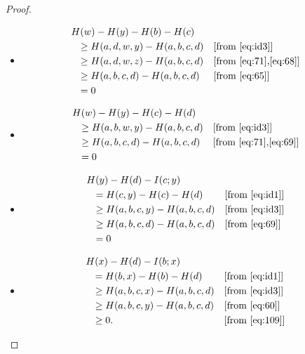 \documentclass[10pt,journal]{IEEEtran}
\begin{document}
\begin{proof}
\begin{itemize}
\item [(iv)]
\begin{align*}
& H(w) - H(y) - H(b) - H(c)\notag\\
&\ \ \ge H(a,d,w,y) - H(a,b,c,d)              & & [\mbox{from \eqref{eq:id3}}] \notag\\
&\ \ \ge H(a,d,w,z) - H(a,b,c,d)              & & [\mbox{from \eqref{eq:71},\eqref{eq:68}}] \notag\\
&\ \ \ge H(a,b,c,d) - H(a,b,c,d)              & & [\mbox{from \eqref{eq:65}}] \notag\\
&\ \ =  0                                     \notag
\end{align*}

\item [(v)]
\begin{align*}
& H(w) - H(y) - H(c) - H(d)\notag\\
&\ \ \ge H(a,b,w,y) - H(a,b,c,d)              & & [\mbox{from \eqref{eq:id3}}] \notag\\
&\ \ \ge H(a,b,c,d) - H(a,b,c,d)              & & [\mbox{from \eqref{eq:71},\eqref{eq:69}}] \notag\\
&\ \ =  0                                     \notag
\end{align*}

\item [(vi)]
\begin{align}
& H(y) - H(d) - I(c;y)\notag\\
&\ \ = H(c,y) - H(c) - H(d)                  & & [\mbox{from \eqref{eq:id1}}] \notag\\
&\ \ \ge H(a,b,c,y) - H(a,b,c,d)             & & [\mbox{from \eqref{eq:id3}}] \notag\\
&\ \ \ge H(a,b,c,d) - H(a,b,c,d)             & & [\mbox{from \eqref{eq:69}}] \notag\\
&\ \ =  0                                    \label{eq:109}
\end{align}

\item [(vii)]
\begin{align*}
& H(x) - H(d) - I(b;x)\notag\\
&\ \ = H(b,x) - H(b) - H(d)                 & & [\mbox{from \eqref{eq:id1}}] \notag\\
&\ \ \ge H(a,b,c,x) - H(a,b,c,d)            & & [\mbox{from \eqref{eq:id3}}] \notag\\
&\ \ \ge H(a,b,c,y) - H(a,b,c,d)            & & [\mbox{from \eqref{eq:60}}] \notag\\
&\ \ \ge  0.                                & & [\mbox{from \eqref{eq:109}}] \notag
\end{align*}

\end{itemize}

\end{proof}
\end{document}
